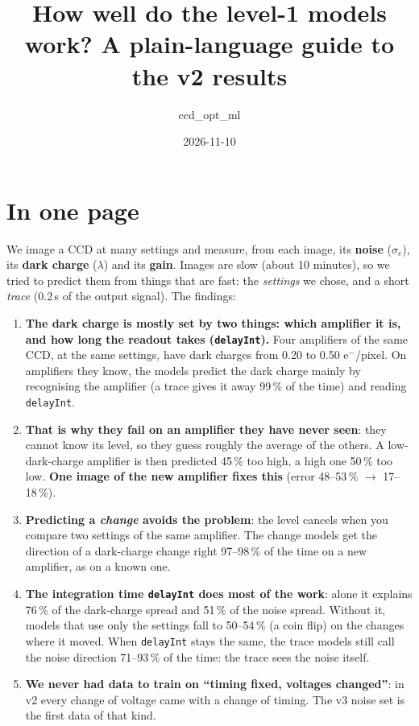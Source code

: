 \documentclass[11pt]{article}
\title{How well do the level-1 models work? A plain-language guide to the v2 results}
\author{ccd\_opt\_ml}
\date{2026-11-10}
\begin{document}
\maketitle

\section*{In one page}
We image a CCD at many settings and measure, from each image, its \textbf{noise} ($\sigma_e$), its \textbf{dark
charge} ($\lambda$) and its \textbf{gain}. Images are slow (about 10 minutes), so we tried to predict them from things
that are fast: the \emph{settings} we chose, and a short \emph{trace} (0.2\,s of the output signal). The findings:
\begin{enumerate}
\item \textbf{The dark charge is mostly set by two things: which amplifier it is, and how long the readout takes
  (\texttt{delayInt}).} Four amplifiers of the same CCD, at the same settings, have dark charges from 0.20 to 0.50
  e$^-$/pixel. On amplifiers they know, the models predict the dark charge mainly by recognising the amplifier (a trace
  gives it away 99\,\% of the time) and reading \texttt{delayInt}.
\item \textbf{That is why they fail on an amplifier they have never seen}: they cannot know its level, so they guess
  roughly the average of the others. A low-dark-charge amplifier is then predicted 45\,\% too high, a high one 50\,\% too
  low. \textbf{One image of the new amplifier fixes this} (error 48--53\,\% $\to$ 17--18\,\%).
\item \textbf{Predicting a \emph{change} avoids the problem}: the level cancels when you compare two settings of the
  same amplifier. The change models get the direction of a dark-charge change right 97--98\,\% of the time on a new
  amplifier, as on a known one.
\item \textbf{The integration time \texttt{delayInt} does most of the work}: alone it explains 76\,\% of the dark-charge
  spread and 51\,\% of the noise spread. Without it, models that use only the settings fall to 50--54\,\% (a coin flip)
  on the changes where it moved. When \texttt{delayInt} stays the same, the trace models still call the noise direction
  71--93\,\% of the time: the trace sees the noise itself.
\item \textbf{We never had data to train on ``timing fixed, voltages changed''}: in v2 every change of voltage came with
  a change of timing. The v3 noise set is the first data of that kind.
\end{enumerate}
\end{document}

